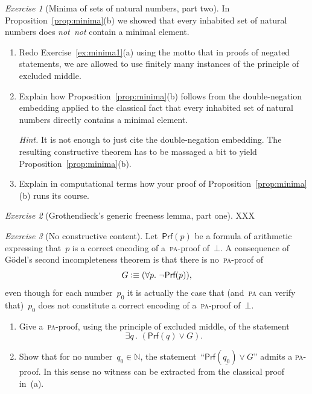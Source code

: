\documentclass[10pt,reqno,a4paper,openany]{amsbook}
\theoremstyle{definition}
\theoremstyle{plain}
\theoremstyle{remark}
\newcommand{\NN}{\mathbb{N}}
\newcommand{\?}{\,{:}\,}
\renewcommand{\_}{\mathpunct{.}\,}
\newcommand{\defequiv}{\vcentcolon\equiv}
\newtheorem{exercise}{Exercise}[chapter]
\newcommand{\notnot}{\emph{not~not}\xspace}
\begin{document}
\begin{exercise}[Minima of sets of natural numbers, part two]
In Proposition~\ref{prop:minima}(b) we showed that every inhabited set of natural
numbers does \notnot contain a minimal element.
\begin{enumerate}
\item Redo Exercise~\ref{ex:minima1}(a) using the motto that in proofs of
negated statements, we are allowed to use finitely many instances of the
principle of excluded middle.
\item Explain how Proposition~\ref{prop:minima}(b) follows
from the double-negation embedding applied to the classical fact that every
inhabited set of natural numbers directly contains a minimal element.

{\noindent\scriptsize\emph{Hint.} It is not enough to just cite the
double-negation embedding. The resulting constructive theorem has to be
massaged a bit to yield Proposition~\ref{prop:minima}(b).\par}
\item Explain in computational terms how your proof of
Proposition~\ref{prop:minima}(b) runs its course.
\end{enumerate}
\end{exercise}

\begin{exercise}[Grothendieck's generic freeness lemma, part one]
XXX
\end{exercise}

\begin{exercise}[No constructive content]\label{ex:no-constructive-content}
Let~$\textsf{Prf}(p)$ be a formula of arithmetic expressing that~$p$ is a
correct encoding of a~\textsc{pa}-proof of~$\bot$. A consequence of Gödel's
second incompleteness theorem is that there is no~\textsc{pa}-proof of
\[ G \defequiv (\forall p\_ \neg\textsf{Prf}(p)), \]
even though for each number~$p_0$ it is actually the case that (and~\textsc{pa}
can verify that)~$p_0$ does not constitute a correct encoding of
a~\textsc{pa}-proof of~$\bot$.
\begin{enumerate}
\item Give a~\textsc{pa}-proof, using the principle of excluded middle, of the
statement
\[ \exists q\_ (\textsf{Prf}(q) \vee G). \]
\item Show that for no number~$q_0 \in \NN$, the
statement~``$\textsf{Prf}(\underline{q_0})
\vee G$'' admits a \textsc{pa}-proof. In this sense no witness can be
extracted from the classical proof in~(a).
\end{enumerate}
\end{exercise}
\end{document}
